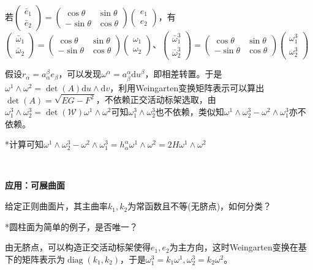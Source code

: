 \documentclass[a4paper,UTF8,fontset=windows]{ctexart}
\DeclareMathOperator{\diag}{diag}
\begin{document}
若$\begin{pmatrix}\bar{e}_1\\\bar{e}_2\end{pmatrix}=\begin{pmatrix}\cos\theta&\sin\theta\\-\sin\theta&\cos\theta\end{pmatrix}\begin{pmatrix}e_1\\e_2\end{pmatrix}$，有$\begin{pmatrix}\bar{\omega}_1\\\bar{\omega}_2\end{pmatrix}=\begin{pmatrix}\cos\theta&\sin\theta\\-\sin\theta&\cos\theta\end{pmatrix}\begin{pmatrix}\omega_1\\\omega_2\end{pmatrix}$、$\begin{pmatrix}\bar{\omega}_1^3\\\bar{\omega}_2^3\end{pmatrix}=\begin{pmatrix}\cos\theta&\sin\theta\\-\sin\theta&\cos\theta\end{pmatrix}\begin{pmatrix}\omega_1^3\\\omega_2^3\end{pmatrix}$

假设$r_\alpha=a_\alpha^\beta e_\beta$，可以发现$\omega^\alpha=a_\beta^\alpha\mathrm{d}u^\beta$，即相差转置。于是$\omega^1\wedge\omega^2=\det(A)\mathrm{d}u\wedge\mathrm{d}v$，利用Weingarten变换矩阵表示可以算出$\det(A)=\sqrt{EG-F^2}$，不依赖正交活动标架选取，由$\omega^3_1\wedge\omega^3_2=\det(\mathcal{W})\omega^1\wedge\omega^2$可知$\omega^3_1\wedge\omega^3_2$也不依赖，类似知$\omega^1\wedge\omega_2^3-\omega^2\wedge\omega_1^3$亦不依赖。

*计算可知$\omega^1\wedge\omega_2^3-\omega^2\wedge\omega_1^3=h_\alpha^\alpha\omega^1\wedge\omega^2=2H\omega^1\wedge\omega^2$

\

\textbf{应用：可展曲面}

给定正则曲面片，其主曲率$k_1,k_2$为常函数且不等(无脐点)，如何分类？

*圆柱面为简单的例子，是否唯一？

由无脐点，可以构造正交活动标架使得$e_1,e_2$为主方向，这时Weingarten变换在基下的矩阵表示为$\diag(k_1,k_2)$，于是$\omega_1^3=k_1\omega^1,\omega_2^3=k_2\omega^2$。
\end{document}
